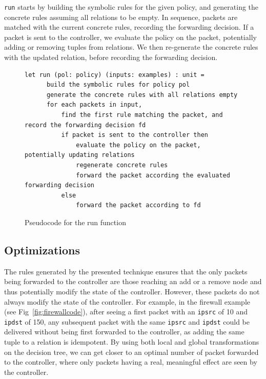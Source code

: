 \documentclass[preprint]{sigplanconf}
\begin{document}
\lstinline|run| starts by building the symbolic rules for the given policy, and generating the concrete rules assuming all relations to be empty. In sequence, packets are matched with the current concrete rules, recording the forwarding decision. If a packet is sent to the controller, we evaluate the policy on the packet, potentially adding or removing tuples from relations. We then re-generate the concrete rules with the updated relation, before recording the forwarding decision.

\begin{figure}[ht]
\begin{lstlisting}
let run (pol: policy) (inputs: examples) : unit =
      build the symbolic rules for policy pol
      generate the concrete rules with all relations empty
      for each packets in input,
          find the first rule matching the packet, and record the forwarding decision fd
          if packet is sent to the controller then
              evaluate the policy on the packet, potentially updating relations
              regenerate concrete rules
              forward the packet according the evaluated forwarding decision
          else
              forward the packet according to fd 
\end{lstlisting}

\caption{Pseudocode for the run function}
\label{fig:run-pseudo}
  \end{figure}



\subsection*{Optimizations}
The rules generated by the presented technique ensures that the only packets being forwarded to the controller are those reaching an add or a remove node and thus potentially modify the state of the controller. However, these packets do not always modify the state of the controller. For example, in the firewall example (see Fig~\ref{fig:firewallcode}), after seeing a first packet with an \lstinline|ipsrc| of 10 and \lstinline|ipdst| of 150, any subsequent packet with the same \lstinline|ipsrc| and \lstinline|ipdst| could be delivered without being first forwarded to the controller, as adding the same tuple to a relation is idempotent. By using both local and global transformations on the decision tree, we can get closer to an optimal number of packet forwarded to the controller, where only packets having a real, meaningful effect are seen by the controller.
\end{document}
